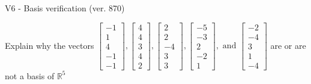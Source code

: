 \begin{exercise}
  \begin{exerciseTitle}V6 - Basis verification (ver. 870)\end{exerciseTitle}
  \begin{exerciseStatement}
    Explain why the vectors \(\left[\begin{array}{r}
-1 \\
1 \\
4 \\
-1 \\
-1
\end{array}\right] , \left[\begin{array}{r}
4 \\
4 \\
3 \\
4 \\
2
\end{array}\right] , \left[\begin{array}{r}
2 \\
2 \\
-4 \\
3 \\
3
\end{array}\right] , \left[\begin{array}{r}
-5 \\
-3 \\
2 \\
-2 \\
1
\end{array}\right] , \text{ and } \left[\begin{array}{r}
-2 \\
-4 \\
3 \\
1 \\
-4
\end{array}\right]\) are or are not a basis of \(\mathbb{R}^5\)	



\end{exerciseStatement}
\end{exercise}
